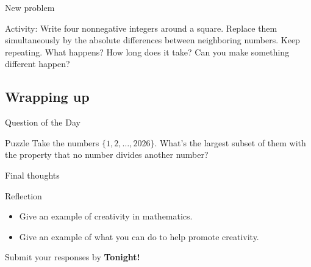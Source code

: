 \documentclass{beamer}
\begin{document}
\begin{frame}{New problem}
  \begin{block}{Activity:}
    Write four nonnegative integers around a square. Replace them simultaneously by the absolute differences between neighboring numbers. Keep repeating.
What happens? How long does it take?  Can you make something different happen? 
  \end{block}
\centering

\end{frame}


\subsection{Wrapping up}

\begin{frame}{Question of the Day}
\pause
  \begin{block}{Puzzle}
    Take the numbers $\{1,2,\dots,2026\}$.  What's the largest subset of them with the property that no number divides another number?
  \end{block}
\end{frame}

\begin{frame}{Final thoughts}
  \begin{block}{Reflection}
    \begin{itemize}
\pause
      \item Give an example of creativity in mathematics.
\pause
      \item Give an example of what you can do to help promote creativity.
    \end{itemize}
  \end{block}
\begin{center}
Submit your responses by \textbf{Tonight!}
\end{center}
\end{frame}
\end{document}
